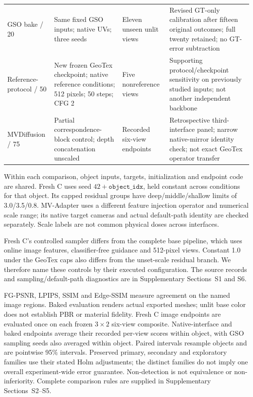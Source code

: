 \documentclass[times,twocolumn,final]{elsarticle}
\begin{document}
\begin{table}[t]
\begin{tabular}{p{}p{}p{}p{}}
GSO bake / 20 & Same fixed GSO inputs; native UVs; three seeds & Eleven unseen unlit views & Revised GT-only calibration after fifteen original outcomes; full twenty retained; no GT-error subtraction \\
Reference-protocol / 50 & New frozen GeoTex checkpoint; native reference conditions; 512 pixels; 50 steps; CFG 2 & Five nonreference views & Supporting protocol/checkpoint sensitivity on previously studied inputs; not another independent backbone \\
MVDiffusion / 75 & Partial correspondence-block control; depth concatenation unscaled & Recorded six-view endpoints & Retrospective third-interface panel; narrow native-mirror identity check; not exact GeoTex operator transfer \\
\bottomrule
\end{tabular}
\end{table}

Within each comparison, object inputs, targets, initialization and endpoint code are shared. Fresh C uses seed $42+\texttt{object\_idx}$, held constant across conditions for that object. Its capped residual groups have deep/middle/shallow limits of 3.0/3.5/0.8. MV-Adapter uses a different feature injection operator and numerical scale range; its native target cameras and actual default-path identity are checked separately. Scale labels are not common physical doses across interfaces.

Fresh C's controlled sampler differs from the complete base pipeline, which uses online image features, classifier-free guidance and 512-pixel views. Constant 1.0 under the GeoTex caps also differs from the unset-scale residual branch. We therefore name these controls by their executed configuration. The source records and sampling/default-path diagnostics are in Supplementary Sections~S1 and S6.

FG-PSNR, LPIPS, SSIM and Edge-SSIM measure agreement on the named image regions. Baked evaluation renders actual exported meshes; unlit base color does not establish PBR or material fidelity. Fresh C image endpoints are evaluated once on each frozen $3\times2$ six-view composite. Native-interface and baked endpoints average their recorded per-view scores within object, with GSO sampling seeds also averaged within object. Paired intervals resample objects and are pointwise 95\% intervals. Preserved primary, secondary and exploratory families use their stated Holm adjustments; the distinct families do not imply one overall experiment-wide error guarantee. Non-detection is not equivalence or non-inferiority. Complete comparison rules are supplied in Supplementary Sections~S2--S5.
\end{document}
